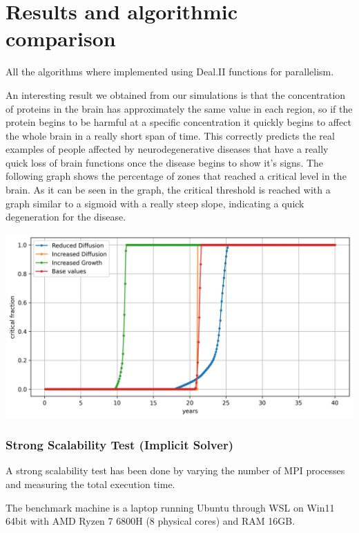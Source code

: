 \documentclass[12pt, letterpaper]{article}
\begin{document}
\pagebreak
\section{Results and algorithmic comparison}
All the algorithms where implemented using Deal.II functions for parallelism.


\noindent An interesting result we obtained from our simulations is that the concentration of proteins in the brain has approximately the same value in each region, so if the protein begins to be harmful at a specific concentration it quickly begins to affect the whole brain in a really short span of time. This correctly predicts the real examples of people affected by neurodegenerative diseases that have a really quick loss of brain functions once the disease begins to show it's signs. The following graph shows the percentage of zones that reached a critical level in the brain. As it can be seen in the graph, the critical threshold is reached with a graph similar to a sigmoid with a really steep slope, indicating a quick degeneration for the disease.
\vspace{1em}

\noindent\includegraphics[width=\textwidth]{pics/critical_fraction_comparing.png}

\pagebreak
\subsubsection*{Strong Scalability Test (Implicit Solver)}
A strong scalability test has been done by varying the number of MPI processes and measuring the total execution time.

\noindent The benchmark machine is a laptop running Ubuntu through WSL on Win11 64bit with
    AMD Ryzen 7 6800H (8 physical cores) and
    RAM 16GB. 
    
\end{document}
